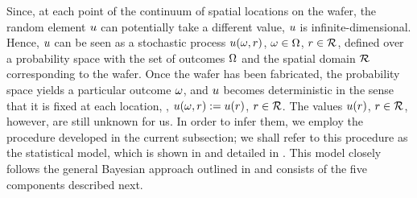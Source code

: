 
Since, at each point of the continuum of spatial locations on the wafer, the random element $u$ can potentially take a different value, $u$ is infinite-dimensional.
Hence, $u$ can be seen as a stochastic process $u(\omega, r)$, $\omega \in \Omega$, $r \in \mathcal{R}$, defined over a probability space with the set of outcomes $\Omega$ \cite{durrett2010} and the spatial domain $\mathcal{R}$ corresponding to the wafer.
Once the wafer has been fabricated, the probability space yields a particular outcome $\omega$, and $u$ becomes deterministic in the sense that it is fixed at each location, \ie, $u(\omega, r) := u(r)$, $r \in \mathcal{R}$.
The values $u(r)$, $r \in \mathcal{R}$, however, are still unknown for us.
In order to infer them, we employ the procedure developed in the current subsection; we shall refer to this procedure as the statistical model, which is shown in  and detailed in . This model closely follows the general Bayesian approach outlined in  and consists of the five components described next.

